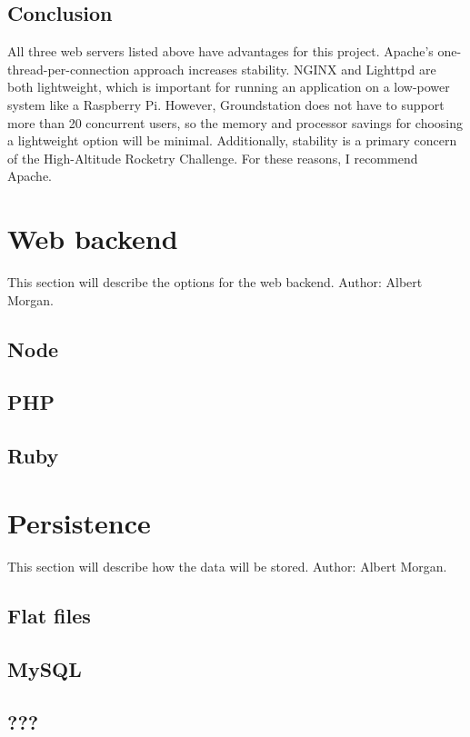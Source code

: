 \documentclass[10pt,draftclsnofoot,onecolumn]{IEEEtran}
\newcommand*{\SignatureAndDate}[1]{
	\vspace{1in}
	\par\noindent\makebox[2.5in]{\hrulefill} \hspace{.5in} \makebox[2.0in]{\hrulefill}
	\par\noindent\makebox[2.5in][l]{#1}      \hspace{.5in} \makebox[2.0in][l]{Date}
}
\begin{document}
	\subsection{Conclusion}
	All three web servers listed above have advantages for this project.
	Apache's one-thread-per-connection approach increases stability.
	NGINX and Lighttpd are both lightweight, which is important for running an application on a low-power system like a Raspberry Pi.
	However, Groundstation does not have to support more than 20 concurrent users, so the memory and processor savings for choosing a lightweight option will be minimal.
	Additionally, stability is a primary concern of the High-Altitude Rocketry Challenge.
	For these reasons, I recommend Apache.


	\section{Web backend}
	This section will describe the options for the web backend. Author: Albert Morgan.
	\subsection{Node}
	\subsection{PHP}
	\subsection{Ruby}
	\section{Persistence}
	This section will describe how the data will be stored. Author: Albert Morgan.
	\subsection{Flat files}
	\subsection{MySQL}
	\subsection{???}

	\printindex






\end{document}
